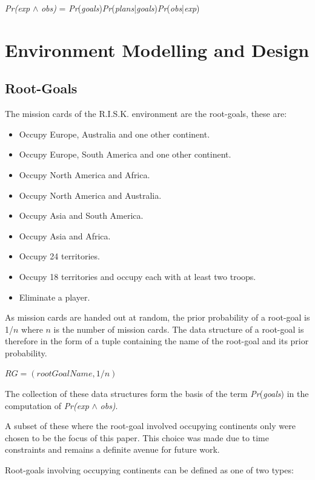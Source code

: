 \documentclass[parskip]{cs4rep}
\begin{document}
\centerline{
\textit{Pr(exp} $\wedge$ \textit{obs)} = \textit{Pr}(\textit{goals})\textit{Pr}(\textit{plans}|\textit{goals})\textit{Pr}(\textit{obs}|\textit{exp})
}

\section{Environment Modelling and Design}

\subsection{Root-Goals}

The mission cards of the R.I.S.K. environment are the root-goals, these are:

\begin{itemize}
\item
Occupy Europe, Australia and one other continent.
\item
Occupy Europe, South America and one other continent.
\item
Occupy North America and Africa.
\item
Occupy North America and Australia.
\item
Occupy Asia and South America.
\item
Occupy Asia and Africa.
\item
Occupy 24 territories.
\item
Occupy 18 territories and occupy each with at least two troops.
\item
Eliminate a player.
\end{itemize}

As mission cards are handed out at random, the prior probability of a root-goal is 1/$n$ where $n$ is the number of mission cards. The data structure of a root-goal is therefore in the form of a tuple containing the name of the root-goal and its prior probability.

\centerline{
 $RG = ( rootGoalName, 1/n)$\newline
}

The collection of these data structures form the basis of the term \textit{Pr}(\textit{goals}) in the computation of \textit{Pr(exp} $\wedge$ \textit{obs)}.

A subset of these where the root-goal involved occupying continents only were chosen to be the focus of this paper. This choice was made due to time constraints and remains a definite avenue for future work. 

Root-goals involving occupying continents can be defined as one of two types:
\end{document}

